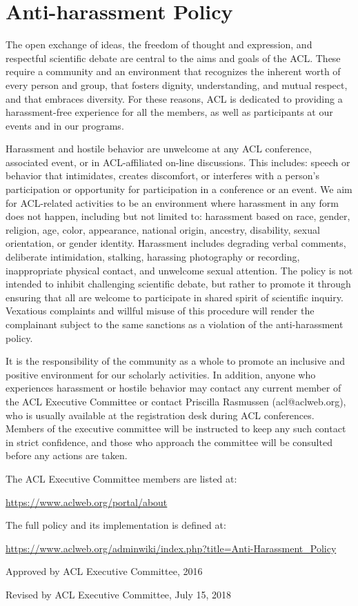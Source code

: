 \chapter[Anti-harassment Policy]{Anti-harassment Policy}
\thispagestyle{emptyheader}

The open exchange of ideas, the freedom of thought and expression, and respectful scientific debate are central to the aims and goals of the ACL. These require a community and an environment that recognizes the inherent worth of every person and group, that fosters dignity, understanding, and mutual respect, and that embraces diversity. For these reasons, ACL is dedicated to providing a harassment-free experience for all the members, as well as participants at our events and in our programs.

Harassment and hostile behavior are unwelcome at any ACL conference, associated event, or in ACL-affiliated on-line discussions. This includes: speech or behavior that intimidates, creates discomfort, or interferes with a person's participation or opportunity for participation in a conference or an event. We aim for ACL-related activities to be an environment where harassment in any form does not happen, including but not limited to: harassment based on race, gender, religion, age, color, appearance, national origin, ancestry, disability, sexual orientation, or gender identity. Harassment includes degrading verbal comments, deliberate intimidation, stalking, harassing photography or recording, inappropriate physical contact, and unwelcome sexual attention. The policy is not intended to inhibit challenging scientific debate, but rather to promote it through ensuring that all are welcome to participate in shared spirit of scientific inquiry. Vexatious complaints and willful misuse of this procedure will render the complainant subject to the same sanctions as a violation of the anti-harassment policy.

It is the responsibility of the community as a whole to promote an inclusive and positive environment for our scholarly activities. In addition, anyone who experiences harassment or hostile behavior may contact any current member of the ACL Executive Committee or contact Priscilla Rasmussen (acl@aclweb.org), who is usually available at the registration desk during ACL conferences. Members of the executive committee will be instructed to keep any such contact in strict confidence, and those who approach the committee will be consulted before any actions are taken.

The ACL Executive Committee members are listed at:

\url{https://www.aclweb.org/portal/about}

The full policy and its implementation is defined at:

\url{https://www.aclweb.org/adminwiki/index.php?title=Anti-Harassment_Policy}

Approved by ACL Executive Committee, 2016

Revised by ACL Executive Committee, July 15, 2018
